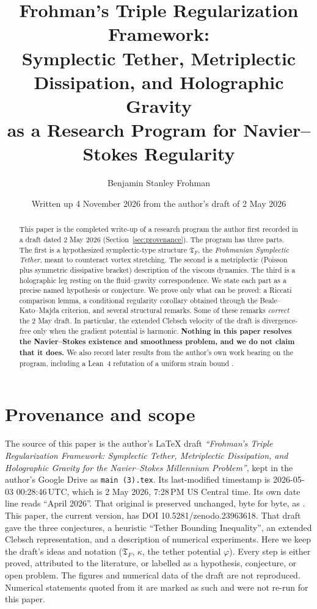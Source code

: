 \documentclass[11pt]{amsart}
\title[Frohman's Triple Regularization Framework]{Frohman's Triple Regularization Framework:\\ Symplectic Tether, Metriplectic Dissipation, and Holographic Gravity\\ as a Research Program for Navier--Stokes Regularity}
\author{Benjamin Stanley Frohman}
\date{Written up 4 November 2026 from the author's draft of 2 May 2026}
\theoremstyle{definition}
\theoremstyle{remark}
\newcommand{\TF}{\mathfrak{T}_F}
\begin{document}
\begin{abstract}
This paper is the completed write-up of a research program the author first recorded in a draft dated 2 May 2026 (Section~\ref{sec:provenance}). The program has three parts. The first is a hypothesized symplectic-type structure $\TF$, the \emph{Frohmanian Symplectic Tether}, meant to counteract vortex stretching. The second is a metriplectic (Poisson plus symmetric dissipative bracket) description of the viscous dynamics. The third is a holographic leg resting on the fluid--gravity correspondence. We state each part as a precise named hypothesis or conjecture. We prove only what can be proved: a Riccati comparison lemma, a conditional regularity corollary obtained through the Beale--Kato--Majda criterion, and several structural remarks. Some of these remarks \emph{correct} the 2 May draft. In particular, the extended Clebsch velocity of the draft is divergence-free only when the gradient potential is harmonic. \textbf{Nothing in this paper resolves the Navier--Stokes existence and smoothness problem, and we do not claim that it does.} We also record later results from the author's own work bearing on the program, including a Lean~4 refutation of a uniform strain bound \cite{FrohmanStrain}.
\end{abstract}
\maketitle

\section{Provenance and scope}\label{sec:provenance}
The source of this paper is the author's \LaTeX{} draft \emph{``Frohman's Triple Regularization Framework: Symplectic Tether, Metriplectic Dissipation, and Holographic Gravity for the Navier--Stokes Millennium Problem''}, kept in the author's Google Drive as \texttt{main (3).tex}. Its last-modified timestamp is 2026-05-03 00:28:46\,UTC, which is 2 May 2026, 7:28\,PM US Central time. Its own date line reads ``April 2026''. That original is preserved unchanged, byte for byte, as \cite{FrohmanOriginal}. This paper, the current version, has DOI 10.5281/zenodo.23963618. That draft gave the three conjectures, a heuristic ``Tether Bounding Inequality'', an extended Clebsch representation, and a description of numerical experiments. Here we keep the draft's ideas and notation ($\TF$, $\kappa$, the tether potential $\varphi$). Every step is either proved, attributed to the literature, or labelled as a hypothesis, conjecture, or open problem. The figures and numerical data of the draft are not reproduced. Numerical statements quoted from it are marked as such and were not re-run for this paper.
\end{document}

